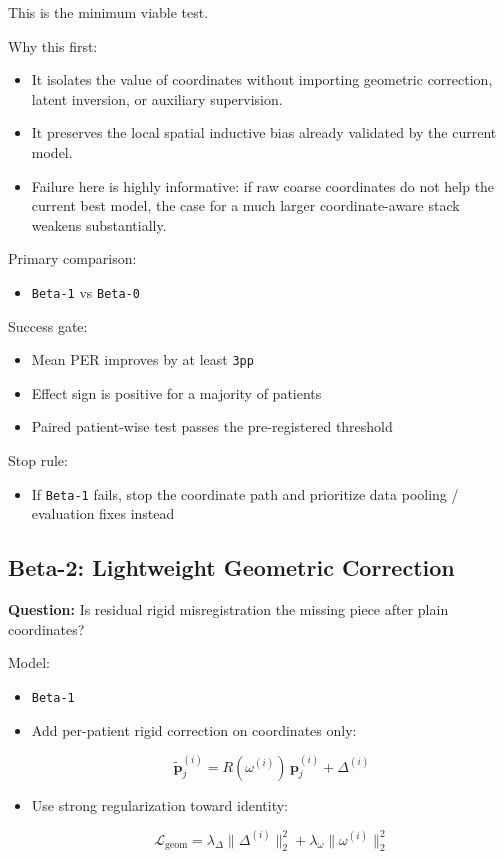 \documentclass[
]{article}
\providecommand{\tightlist}{%
  \setlength{\itemsep}{0pt}\setlength{\parskip}{0pt}}
\begin{document}
This is the minimum viable test.

Why this first:

\begin{itemize}
\tightlist
\item
  It isolates the value of coordinates without importing geometric
  correction, latent inversion, or auxiliary supervision.
\item
  It preserves the local spatial inductive bias already validated by the
  current model.
\item
  Failure here is highly informative: if raw coarse coordinates do not
  help the current best model, the case for a much larger
  coordinate-aware stack weakens substantially.
\end{itemize}

Primary comparison:

\begin{itemize}
\tightlist
\item
  \texttt{Beta-1} vs \texttt{Beta-0}
\end{itemize}

Success gate:

\begin{itemize}
\tightlist
\item
  Mean PER improves by at least \texttt{3pp}
\item
  Effect sign is positive for a majority of patients
\item
  Paired patient-wise test passes the pre-registered threshold
\end{itemize}

Stop rule:

\begin{itemize}
\tightlist
\item
  If \texttt{Beta-1} fails, stop the coordinate path and prioritize data
  pooling / evaluation fixes instead
\end{itemize}

\subsection{Beta-2: Lightweight Geometric
Correction}\label{beta-2-lightweight-geometric-correction}

\textbf{Question:} Is residual rigid misregistration the missing piece
after plain coordinates?

Model:

\begin{itemize}
\item
  \texttt{Beta-1}
\item
  Add per-patient rigid correction on coordinates only:

  \[
  \tilde{\mathbf{p}}_j^{(i)} = R(\omega^{(i)})\,\mathbf{p}_j^{(i)} + \Delta^{(i)}
  \]
\item
  Use strong regularization toward identity:

  \[
  \mathcal{L}_{\text{geom}} = \lambda_{\Delta}\|\Delta^{(i)}\|_2^2 + \lambda_{\omega}\|\omega^{(i)}\|_2^2
  \]
\end{itemize}
\end{document}
